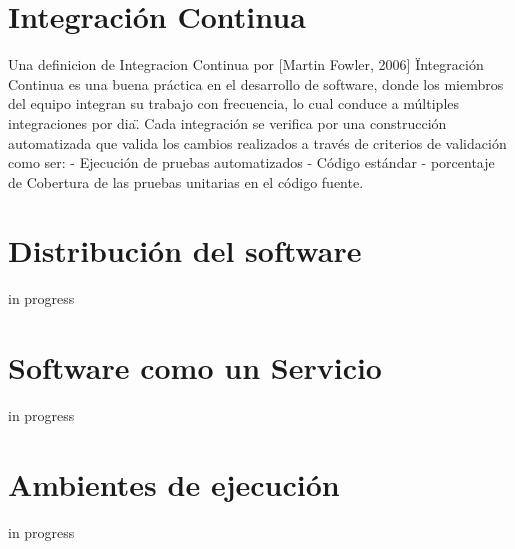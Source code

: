 \section{Integración Continua}
\noindent Una definicion de Integracion Continua por [Martin Fowler, 2006] \"Integración Continua es una buena práctica en el desarrollo de software, donde los miembros del equipo integran su trabajo con frecuencia, lo cual conduce a múltiples integraciones por dia\". Cada integración se verifica por una construcción automatizada que valida los cambios realizados a través de criterios de validación como ser:
- Ejecución de pruebas automatizados
- Código estándar
- porcentaje de Cobertura de las pruebas unitarias en el código fuente.

\section{Distribución del software}
\noindent in progress

\section{Software como un Servicio}
\noindent in progress

\section{Ambientes de ejecución}
\noindent in progress
